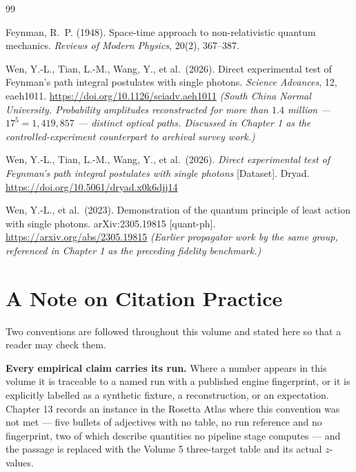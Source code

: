 \documentclass[11pt, letterpaper, openany]{book}
\begin{document}
\begin{thebibliography}{99}

Feynman, R.~P. (1948).
Space-time approach to non-relativistic quantum mechanics.
\textit{Reviews of Modern Physics}, 20(2), 367--387.

Wen, Y.-L., Tian, L.-M., Wang, Y., et al.\ (2026).
Direct experimental test of Feynman's path integral postulates with single photons.
\textit{Science Advances}, 12, eaeh1011.
\url{https://doi.org/10.1126/sciadv.aeh1011}
\textit{(South China Normal University. Probability amplitudes reconstructed for
more than $1.4$ million --- $17^5 = 1{,}419{,}857$ --- distinct optical paths.
Discussed in Chapter 1 as the controlled-experiment counterpart to archival survey work.)}

Wen, Y.-L., Tian, L.-M., Wang, Y., et al.\ (2026).
\textit{Direct experimental test of Feynman's path integral postulates with single
photons} [Dataset]. Dryad.
\url{https://doi.org/10.5061/dryad.x0k6djj14}

Wen, Y.-L., et al.\ (2023).
Demonstration of the quantum principle of least action with single photons.
arXiv:2305.19815 [quant-ph].
\url{https://arxiv.org/abs/2305.19815}
\textit{(Earlier propagator work by the same group, referenced in Chapter 1 as the
preceding fidelity benchmark.)}

\end{thebibliography}

\section*{A Note on Citation Practice}

Two conventions are followed throughout this volume and stated here so that a reader may
check them.

\textbf{Every empirical claim carries its run.} Where a number appears in this volume it is
traceable to a named run with a published engine fingerprint, or it is explicitly labelled as
a synthetic fixture, a reconstruction, or an expectation. Chapter 13 records an instance in
the Rosetta Atlas where this convention was not met --- five bullets of adjectives with no
table, no run reference and no fingerprint, two of which describe quantities no pipeline stage
computes --- and the passage is replaced with the Volume 5 three-target table and its actual
$z$-values.
\end{document}
